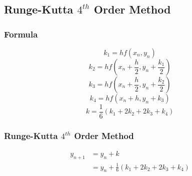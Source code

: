 \subsection{Runge-Kutta $4^{th}$ Order Method}

\subsubsection{Formula}

\[k_1 = hf(x_n, y_n)\]
\[k_2 = hf(x_n + \frac{h}{2}, y_n + \frac{k_1}{2})\]
\[k_3 = hf(x_n + \frac{h}{2}, y_n + \frac{k_2}{2})\]
\[k_4 = hf(x_n + h, y_n + k_3)\]
\[k = \frac{1}{6} \left(k_1 + 2k_2 + 2k_3 + k_4\right)\]

\subsubsection{Runge-Kutta $4^{th}$ Order Method}

\begin{align*}
    {y}_{n+1} &= y_n + k\\
    &= y_n + \frac{1}{6} \left(k_1 + 2k_2 + 2k_3 + k_4\right)
\end{align*}



